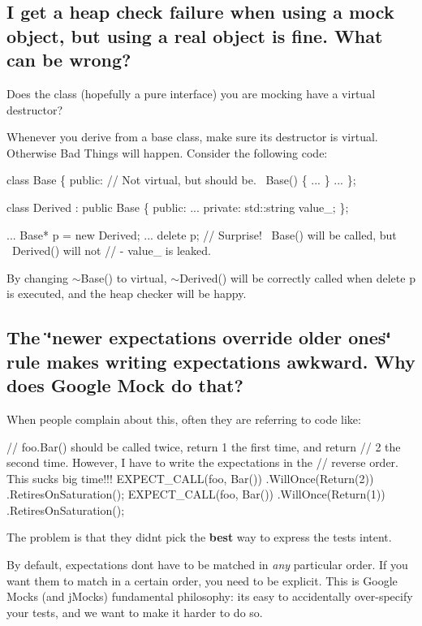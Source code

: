 \subsection*{I get a heap check failure when using a mock object, but using a real object is fine. What can be wrong?}

Does the class (hopefully a pure interface) you are mocking have a virtual destructor?

Whenever you derive from a base class, make sure its destructor is virtual. Otherwise Bad Things will happen. Consider the following code\+:


\begin{DoxyCode}
class Base \{
 public:
  // Not virtual, but should be.
  ~Base() \{ ... \}
  ...
\};

class Derived : public Base \{
 public:
  ...
 private:
  std::string value\_;
\};

...
  Base* p = new Derived;
  ...
  delete p;  // Surprise! ~Base() will be called, but ~Derived() will not
             // - value\_ is leaked.
\end{DoxyCode}


By changing {\ttfamily $\sim$\+Base()} to virtual, {\ttfamily $\sim$\+Derived()} will be correctly called when {\ttfamily delete p} is executed, and the heap checker will be happy.

\subsection*{The \char`\"{}newer expectations override older ones\char`\"{} rule makes writing expectations awkward. Why does Google Mock do that?}

When people complain about this, often they are referring to code like\+:


\begin{DoxyCode}
// foo.Bar() should be called twice, return 1 the first time, and return
// 2 the second time.  However, I have to write the expectations in the
// reverse order.  This sucks big time!!!
EXPECT\_CALL(foo, Bar())
    .WillOnce(Return(2))
    .RetiresOnSaturation();
EXPECT\_CALL(foo, Bar())
    .WillOnce(Return(1))
    .RetiresOnSaturation();
\end{DoxyCode}


The problem is that they didn\textquotesingle{}t pick the {\bfseries best} way to express the test\textquotesingle{}s intent.

By default, expectations don\textquotesingle{}t have to be matched in {\itshape any} particular order. If you want them to match in a certain order, you need to be explicit. This is Google Mock\textquotesingle{}s (and j\+Mock\textquotesingle{}s) fundamental philosophy\+: it\textquotesingle{}s easy to accidentally over-\/specify your tests, and we want to make it harder to do so.

